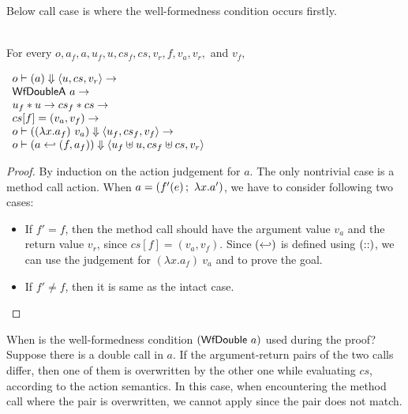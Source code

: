 Below call case is where the well-formedness condition occurs firstly.

\begin{lemma}
  \label{lem-inlinedm-action-call}
  \mbox{}\\
  For every $o, a_f, a, u_f, u, cs_f, cs, v_r, f, v_a, v_r,$ and $v_f,$
  \begin{center}
    \begin{math}
      \begin{array}{l}
        \semact{o}{a}{u}{cs}{v_r} \to \\
        \wfdoublea{a} \to \\
        \sdisj{u_f}{u} \to \mdisj{cs_f}{cs} \to \\
        cs[f] = (v_a, v_f) \to \\
        \semact{o}{(\lambda x.a_f)\ v_a}{u_f}{cs_f}{v_f} \to \\
        \semact{o}{\inlinedm{a}{(f, a_f)}}{\splus{u_f}{u}}{\mplus{cs_f}{cs}}{v_r}
      \end{array}
    \end{math}
  \end{center}
\end{lemma}
\begin{proof}
  By induction on the action judgement for $a$. The only nontrivial
  case is a method call action. When $a = (\actcall{x}{f'}{e}{a'})$,
  we have to consider following two cases:
  \begin{itemize}
  \item If $f' = f$, then the method call should have the argument
    value $v_a$ and the return value $v_r$, since $cs[f] = (v_a,
    v_f)$. Since $(\inlinedmsymb)$ is defined using $(\concatsymb)$,
    we can use the judgement for $(\lambda x.a_f)\ v_a$ and
     to prove the goal.
  \item If $f' \neq f$, then it is same as the intact case.
  \end{itemize}
\end{proof}

When is the well-formedness condition $(\wfdouble{a})$ used during the
proof? Suppose there is a double call in $a$. If the argument-return
pairs of the two calls differ, then one of them is overwritten by the
other one while evaluating $cs$, according to the action semantics. In
this case, when encountering the method call where the pair is
overwritten, we cannot apply  since the pair
does not match.

